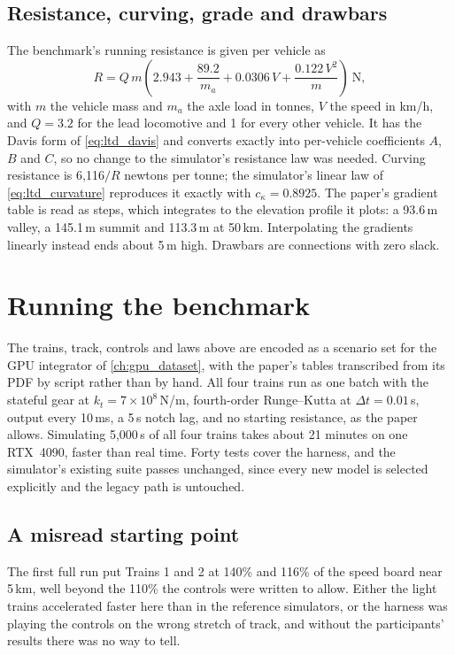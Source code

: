 \subsection{Resistance, curving, grade and drawbars}

The benchmark's running resistance is given per vehicle as
\begin{equation}
    R = Q\,m\left(2.943 + \frac{89.2}{m_a} + 0.0306\,V + \frac{0.122\,V^{2}}{m}\right)\ \text{N},
    \label{eq:bench_resistance}
\end{equation}
with $m$ the vehicle mass and $m_a$ the axle load in tonnes, $V$ the speed in km/h, and $Q = 3.2$ for the lead locomotive and 1 for every other vehicle. It has the Davis form of \cref{eq:ltd_davis} and converts exactly into per-vehicle coefficients $A$, $B$ and $C$, so no change to the simulator's resistance law was needed. Curving resistance is 6,116$/R$ newtons per tonne; the simulator's linear law of \cref{eq:ltd_curvature} reproduces it exactly with $c_\kappa = 0.8925$. The paper's gradient table is read as steps, which integrates to the elevation profile it plots: a 93.6\,m valley, a 145.1\,m summit and 113.3\,m at 50\,km. Interpolating the gradients linearly instead ends about 5\,m high. Drawbars are connections with zero slack.

\section{Running the benchmark}
\label{sec:bench_run}

The trains, track, controls and laws above are encoded as a scenario set for the GPU integrator of \cref{ch:gpu_dataset}, with the paper's tables transcribed from its PDF by script rather than by hand. All four trains run as one batch with the stateful gear at $k_t = 7\times10^{8}$\,N/m, fourth-order Runge--Kutta at $\Delta t = 0.01$\,s, output every 10\,ms, a 5\,s notch lag, and no starting resistance, as the paper allows. Simulating 5,000\,s of all four trains takes about 21 minutes on one RTX~4090, faster than real time. Forty tests cover the harness, and the simulator's existing suite passes unchanged, since every new model is selected explicitly and the legacy path is untouched.

\subsection{A misread starting point}

The first full run put Trains 1 and 2 at 140\% and 116\% of the speed board near 5\,km, well beyond the 110\% the controls were written to allow. Either the light trains accelerated faster here than in the reference simulators, or the harness was playing the controls on the wrong stretch of track, and without the participants' results there was no way to tell.

